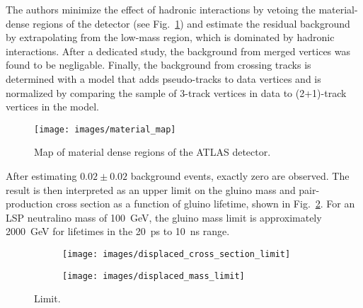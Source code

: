 \documentclass[12pt]{article}
\begin{document}
        The authors minimize the effect of hadronic interactions by vetoing the material-dense regions of the detector (see Fig.~\ref{material_map}) and estimate the residual background by extrapolating from the low-mass region, which is dominated by hadronic interactions. After a dedicated study, the background from merged vertices was found to be negligable. Finally, the background from crossing tracks is determined with a model that adds pseudo-tracks to data vertices and is normalized by comparing the sample of 3-track vertices in data to (2+1)-track vertices in the model.

        \noindent \begin{figure}[htbp] \begin{center}
        \texttt{[image: images/material\_map]}
        \caption{Map of material dense regions of the ATLAS detector.}
        \label{material_map}
        \end{center} \end{figure}

        After estimating $\num{0.02} \pm \num{0.02}$ background events, exactly zero are observed. The result is then interpreted as an upper limit on the gluino mass and pair-production cross section as a function of gluino lifetime, shown in Fig.~\ref{displaced_limit}. For an LSP neutralino mass of \SI{100}{\giga\electronvolt}, the gluino mass limit is approximately \SI{2000}{\giga\electronvolt} for lifetimes in the \SI{20}{\pico\s} to \SI{10}{\nano\s} range. 

        \noindent \begin{figure}[htbp] \begin{center}
        \begin{subfigure}[htbp]{0.45\textwidth} \begin{center}
        \texttt{[image: images/displaced\_cross\_section\_limit]}
        \end{center} \end{subfigure}
        \begin{subfigure}[htbp]{0.45\textwidth} \begin{center}
        \texttt{[image: images/displaced\_mass\_limit]}
        \end{center} \end{subfigure}
        \caption{Limit.}
        \label{displaced_limit}
        \end{center} \end{figure}
\end{document}

